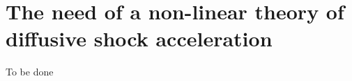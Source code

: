 \section{The need of a non-linear theory of diffusive shock acceleration}

{\color{red}To be done}

%
%
%
%
%
